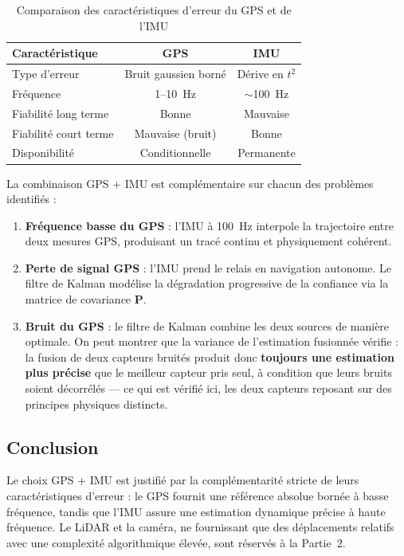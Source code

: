\begin{table}[htbp]
    \centering
    \caption{Comparaison des caractéristiques d'erreur du GPS et de l'IMU}
    \begin{tabular}{lcc}
        \hline
        \textbf{Caractéristique} & \textbf{GPS} & \textbf{IMU} \\
        \hline
        Type d'erreur        & Bruit gaussien borné & Dérive en $t^2$ \\
        Fréquence            & 1--10~Hz             & $\sim$100~Hz    \\
        Fiabilité long terme & Bonne                & Mauvaise        \\
        Fiabilité court terme & Mauvaise (bruit)    & Bonne           \\
        Disponibilité        & Conditionnelle       & Permanente      \\
        \hline
    \end{tabular}
    \label{tab:capteurs}
\end{table}

La combinaison GPS + IMU est complémentaire sur chacun des problèmes identifiés :

\begin{enumerate}
    \item \textbf{Fréquence basse du GPS} : l'IMU à 100~Hz interpole la
    trajectoire entre deux mesures GPS, produisant un tracé continu et
    physiquement cohérent.
    \item \textbf{Perte de signal GPS} : l'IMU prend le relais en navigation
    autonome. Le filtre de Kalman modélise la dégradation progressive de
    la confiance via la matrice de covariance $\mathbf{P}$.
    \item \textbf{Bruit du GPS} : le filtre de Kalman combine les deux
    sources de manière optimale. On peut montrer que la variance de
    l'estimation fusionnée vérifie : la fusion de deux capteurs bruités produit
    donc \textbf{toujours une estimation plus précise} que le meilleur capteur
    pris seul, à condition que leurs bruits soient décorrélés — ce qui est
    vérifié ici, les deux capteurs reposant sur des principes physiques distincts.
\end{enumerate}

\subsection*{Conclusion}

Le choix GPS + IMU est justifié par la complémentarité stricte de leurs
caractéristiques d'erreur : le GPS fournit une référence absolue bornée à
basse fréquence, tandis que l'IMU assure une estimation dynamique précise à
haute fréquence. Le LiDAR et la caméra, ne fournissant que des déplacements
relatifs avec une complexité algorithmique élevée, sont réservés à la Partie~2.